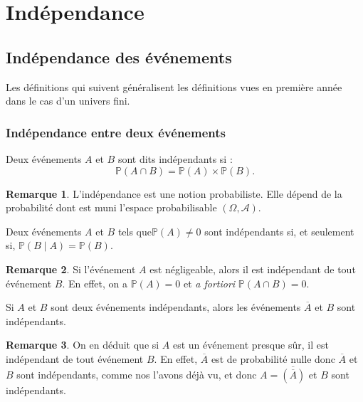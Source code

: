 \documentclass[french]{article}
\renewcommand{\P}{\mathbb{P}}
\theoremstyle{plain}
\theoremstyle{definition}
\newtheorem*{rmq}{Remarque}
\theoremstyle{remark}
\begin{document}
\section{Indépendance}

\subsection{Indépendance des événements}

Les définitions qui suivent généralisent les définitions vues en première année dans le cas d'un univers fini.

\subsubsection*{Indépendance entre deux événements}

\begin{dfn}
	Deux événements $A$ et $B$ sont dits indépendants si : $$\P(A\cap B)=\P(A)\times\P(B).$$
\end{dfn}

\begin{rmq}
	L'indépendance est une notion probabiliste. Elle dépend de la probabilité dont est muni l'espace probabilisable $(\Omega,\mathcal{A})$.
\end{rmq}

\begin{prop}%
	Deux événements $A$ et $B$ tels que$\P(A)\ne 0$ sont indépendants si, et seulement si, $\P(B\mid A)=\P(B)$.
\end{prop}

\begin{rmq}
	Si l'événement $A$ est négligeable, alors il est indépendant de tout événement $B$. En effet, on a $\P(A)=0$ et \textit{a fortiori} $\P(A\cap B)=0$.
\end{rmq}

\begin{prop}%
	Si $A$ et $B$ sont deux événements indépendants, alors les événements $\overline{A}$ et $B$ sont indépendants.
\end{prop}

\begin{rmq}
	On en déduit que si $A$ est un événement presque sûr, il est indépendant de tout événement $B$. En effet, $\overline{A}$ est de probabilité nulle donc $\overline{A}$ et $B$ sont indépendants, comme nos l'avons déjà vu, et donc $A=\overline{(\overline{A})}$ et $B$ sont indépendants.
\end{rmq}
\end{document}
